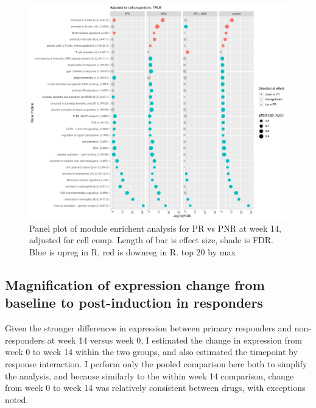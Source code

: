 \begin{outline}
\begin{figure}
    \centering
    \includegraphics[width=1.0\textwidth,page=1]{mainmatter/figures/chapter_04/plot_gene_set_enrichment.tmodCERNO_panelplot_reversed_C_3RI_3NI,C_3RA_3NA,C_(3RI_3NI)_(3RA_3NA),C_3R_3N.cell_prop_correction_TRUE.pdf}
    \caption{Panel plot of module enrichent analysis for PR vs PNR at week 14, adjusted for cell comp. Length of bar is effect size, shade is FDR. Blue is upreg in R, red is downreg in R. top 20 by max}
    \label{fig:multipants_dge_panelPlot_week_14_R_N_cellPropT}
\end{figure}

\subsection{Magnification of expression change from baseline to post-induction in responders}

Given the stronger differences in expression between primary responders and non-responders at week 14 versus week 0,
I estimated the change in expression from week 0 to week 14 within the two groups, and also estimated the timepoint by response interaction.
I perform only the pooled comparison here both to simplify the analysis, and because similarly to the within week 14 comparison, change from week 0 to week 14 was relatively consistent between drugs, with exceptions noted.


\end{outline}
